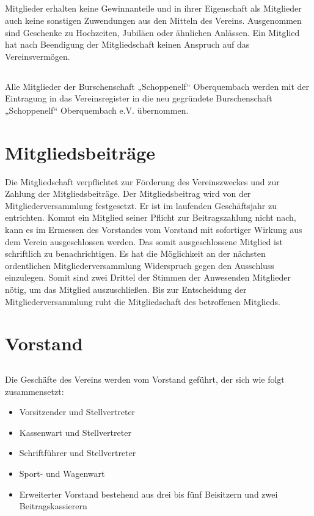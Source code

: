 	\subsection{} Mitglieder erhalten keine Gewinnanteile und in ihrer Eigenschaft als Mitglieder auch keine sonstigen Zuwendungen aus den Mitteln des Vereins. Ausgenommen sind Geschenke zu Hochzeiten, Jubiläen oder ähnlichen Anlässen. Ein Mitglied hat nach Beendigung der Mitgliedschaft keinen Anspruch auf das Vereinsvermögen. 
	
	\subsection{} Alle Mitglieder der Burschenschaft „Schoppenelf“ Oberquembach werden mit der Eintragung in das Vereinsregister in die neu gegründete Burschenschaft „Schoppenelf“ Oberquembach e.V. übernommen.

\section{Mitgliedsbeiträge}	\label{14}
Die Mitgliedschaft verpflichtet zur Förderung des Vereinszweckes und zur Zahlung der Mitgliedsbeiträge. Der Mitgliedsbeitrag wird von der Mitgliederversammlung festgesetzt.
Er ist im laufenden Geschäftsjahr zu entrichten. Kommt ein Mitglied seiner Pflicht zur Beitragszahlung nicht nach, kann es im Ermessen des Vorstandes vom Vorstand mit sofortiger Wirkung aus dem Verein ausgeschlossen werden. Das somit ausgeschlossene Mitglied ist schriftlich zu benachrichtigen. Es hat die Möglichkeit an der nächsten ordentlichen Mitgliederversammlung Widerspruch gegen den Ausschluss einzulegen. Somit sind zwei Drittel der Stimmen der Anwesenden Mitglieder nötig, um das Mitglied auszuschließen. Bis zur Entscheidung der Mitgliederversammlung ruht die Mitgliedschaft des betroffenen Mitglieds. 

\section{Vorstand}
	\subsection {} Die Geschäfte des Vereins werden vom Vorstand geführt, der sich wie folgt zusammensetzt:
	\begin{itemize}
		\item Vorsitzender und Stellvertreter 
		\item Kassenwart und Stellvertreter
		\item Schriftführer und Stellvertreter 
		\item Sport- und Wagenwart
		\item Erweiterter Vorstand bestehend aus drei bis fünf Beisitzern und zwei Beitragskassierern  
	\end{itemize} 
	
